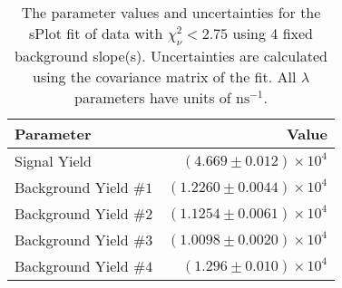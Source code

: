 
\begin{table}
    \begin{center}
        \begin{tabular}{lr}\toprule
            Parameter & Value \\\midrule
            Signal Yield & $(4.669 \pm 0.012) \times 10^{4}$ \\
            Background Yield $\#1$ & $(1.2260 \pm 0.0044) \times 10^{4}$ \\
            Background Yield $\#2$ & $(1.1254 \pm 0.0061) \times 10^{4}$ \\
            Background Yield $\#3$ & $(1.0098 \pm 0.0020) \times 10^{4}$ \\
            Background Yield $\#4$ & $(1.296 \pm 0.010) \times 10^{4}$ \\\bottomrule
        \end{tabular}
        \caption{The parameter values and uncertainties for the sPlot fit of data with $\chi^2_\nu < 2.75$ using 4 fixed background slope(s). Uncertainties are calculated using the covariance matrix of the fit. All $\lambda$ parameters have units of $\si{\nano\second}^{-1}$.}
    \end{center}
\end{table}
